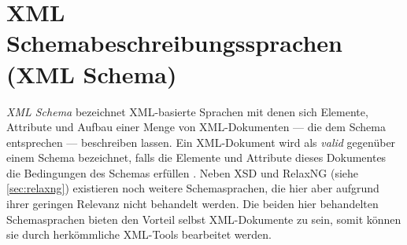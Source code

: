 \section{XML Schemabeschreibungssprachen (XML Schema)}
\label{sec:xmlschema}

\emph{XML Schema} bezeichnet XML-basierte Sprachen mit denen sich Elemente, Attribute und Aufbau einer Menge von XML-Dokumenten --- die dem Schema entsprechen --- beschreiben lassen. 
Ein XML-Dokument wird als \emph{valid} gegenüber einem Schema bezeichnet, falls die Elemente und Attribute dieses Dokumentes die Bedingungen des Schemas erfüllen \cite{taxonomyXMLSchema}.
Neben XSD und RelaxNG (siehe \cref{sec:relaxng}) existieren noch weitere Schemasprachen, die hier aber aufgrund ihrer geringen Relevanz nicht behandelt werden. Die beiden hier behandelten Schemasprachen bieten den Vorteil selbst XML-Dokumente zu sein, somit können sie durch herkömmliche XML-Tools bearbeitet werden.



